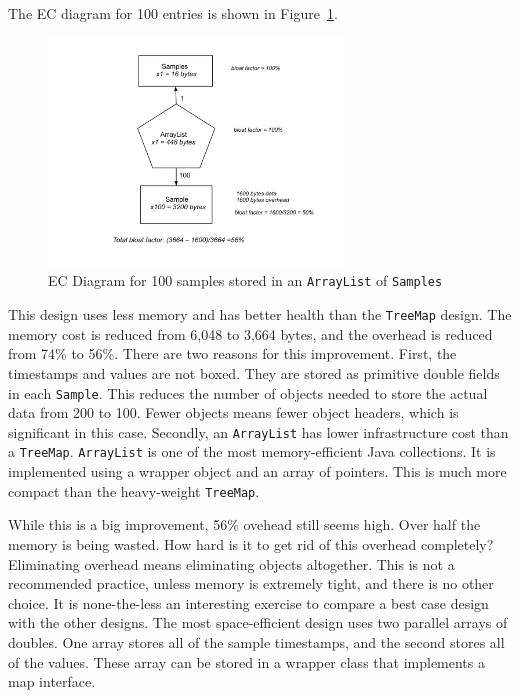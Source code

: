\documentclass{book}
\theoremstyle{definition}
\begin{document}
The EC diagram for 100 entries is shown in Figure~\ref{fig:content-schematic-arraylist-pairs}.
\begin{figure}
  \centering
 \includegraphics[width=0.7\textwidth]{Figures/chapter3/arraylist-doubles}
  \caption{EC Diagram for 100 samples stored in an \texttt{ArrayList} of \texttt{Samples}}
  \label{fig:content-schematic-arraylist-pairs}
\end{figure} 
This design uses less memory and has better health than the \texttt{TreeMap} design. The memory cost is reduced from 6,048 to 3,664 bytes, and the overhead is reduced from 74\% to 56\%.  There are two reasons for this improvement. First, the timestamps and values are not boxed. They are stored as primitive double fields in each \texttt{Sample}. This reduces the number of objects needed to store the actual data from 200 to 100. Fewer objects means fewer object headers, which is significant in this case. Secondly, an \texttt{ArrayList} has lower infrastructure cost than a \texttt{TreeMap}. \texttt{ArrayList} is one of the most memory-efficient Java collections. It is implemented using a wrapper object and an array of pointers. This is much more compact than the heavy-weight \texttt{TreeMap}. 

While this is a big improvement, 56\% ovehead still seems high. Over half the memory is being wasted. How hard is it to get rid of this overhead completely? Eliminating overhead means eliminating objects altogether. This is not a recommended practice, unless memory is extremely tight, and there is no other choice. It is none-the-less an interesting exercise to compare a best case design with the other designs. The most space-efficient design uses two parallel arrays of doubles. One array stores all of the sample timestamps, and the second stores all of the values. These array can be stored in a wrapper class that implements a map interface.
\end{document}
